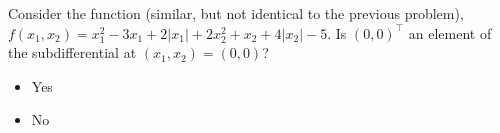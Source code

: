 \documentclass{article}
\begin{document}
Consider the function (similar, but not identical to the previous problem), $f(x_1, x_2) = x_1^2 - 3x_1 + 2|x_1| + 2x_2^2 + x_2 + 4|x_2| - 5$. Is $(0, 0)^\top$ an element of the subdifferential at $(x_1, x_2) = (0, 0)$?

\begin{itemize}
    \item Yes
    \item No
\end{itemize}
\end{document}
